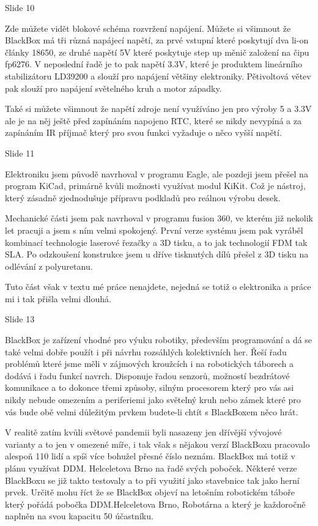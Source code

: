 
Slide 10

Zde můžete vidět blokové schéma rozvržení napájení.
Můžete si všimnout že BlackBox má tři různá napájecí napětí, za prvé vstupní které poskytují dva li-on články 18650, 
ze druhé napětí 5V které poskytuje step up měnič založení na čipu fp6276. V neposlední řadě je to pak napětí 3.3V,
které je produktem lineárního stabilizátoru LD39200 a slouží pro napájení většiny elektroniky.
Pětivoltová větev pak slouží pro napájení světelného kruh a motor západky.

Také si můžete všimnout že napětí zdroje není využíváno jen pro výroby 5 a 3.3V ale je na něj ještě před zapínáním 
napojeno RTC, které se nikdy nevypíná a za zapínáním IR příjmač který pro svou funkci vyžaduje o něco vyšší napětí.


Slide 11

Elektroniku jsem původě navrhoval v programu Eagle, ale pozdeji jsem přešel na program KiCad, primárně kvůli možnosti
využívat modul KiKit. Což je nástroj, který zásadně zjednodušuje přípravu podkladů pro reálnou výrobu desek. 

Mechanické části jsem pak navrhoval v programu fusion 360, ve kterém již nekolik let pracuji a jsem s ním velmi spokojený.
První verze systému jsem pak vyráběl kombinací technologie laserové řezačky a 3D tisku, a to jak technologií FDM tak SLA.
Po odzkoušení konstrukce jsem u dříve tisknutých dílů přešel z 3D tisku na odlévání z polyuretanu. 

Tuto část však v textu mé práce nenajdete, nejedná se totiž o elektronika a práce mi i tak přišla velmi dlouhá.


Slide 13

 
BlackBox je zařízení vhodné pro výuku robotiky, především programování a dá se také velmi dobře použít i při návrhu rozsáhlých 
kolektivních her. Řeší řadu problémů které jsme měli v zájmových kroužcích i na robotických táborech a dodává i řadu funkcí navrch.
Disponuje řadou senzorů, možností bezdrátové komunikace a to dokonce třemi způsoby, silným procesorem který pro vás asi nikdy nebude omezením
a periferiemi jako světelný kruh nebo zámek které pro vás bude obě velmi důležitým prvkem budete-li chtít s BlackBoxem něco hrát.

V realitě zatím kvůli světové pandemii byli nasazeny jen dřívější vývojové varianty a to jen v omezené míře, i tak však s nějakou verzí BlackBoxu 
pracovalo alespoň 110 lidí a spíš více bohužel přesné číslo neznám. BlackBox má totiž v plánu využívat DDM. Helceletova Brno na řadě svých poboček.
Některé verze BlackBoxu se již takto testovaly a to při využití jako stavebnice tak jako herní prvek. Určitě mohu říct že se BlackBox objeví 
na letošním robotickém táboře který pořádá pobočka DDM.Helceletova Brno, Robotárna a který je každoročně naplněn na svou kapacitu 50 účastníku. %

